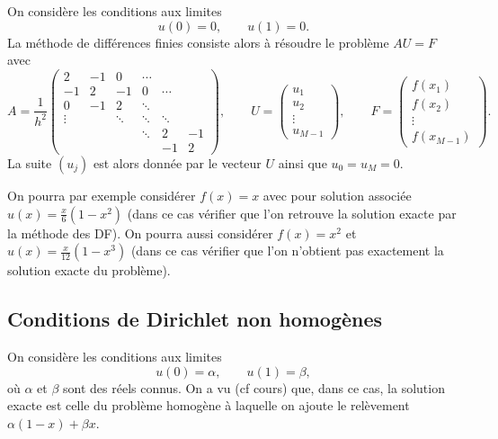 \documentclass[12pt]{article}
\begin{document}
On consid\`ere les conditions aux limites
\begin{equation}
  \label{eq:Dir_hom}
  u(0) = 0 , \qquad u(1) = 0 .
\end{equation}
La m\'ethode de diff\'erences finies consiste alors \`a r\'esoudre le probl\`eme
$A U = F$ avec
\begin{equation}
  \label{eq:matDir}
  A = \dfrac{1}{h^2} 
  \begin{pmatrix} 
    2 & -1 & 0 & \cdots
    \\
    -1 & 2 & -1 & 0 & \cdots
    \\
    0 & -1 & 2 & \ddots &
    \\
    \vdots & & \ddots & \ddots & \ddots
    \\
    & & &  \ddots & 2 & -1
    \\
    & &  & & -1 & 2
  \end{pmatrix} , \qquad U = 
  \begin{pmatrix}
    u_1 \\ u_2 \\ \vdots \\ u_{M-1}
  \end{pmatrix} , \qquad F = 
  \begin{pmatrix}
    f(x_1) \\ f(x_2) \\ \vdots \\ f(x_{M-1})
  \end{pmatrix} .
\end{equation}
La suite $(u_j)$ est alors donn\'ee par le vecteur $U$ ainsi que $u_0 = u_M = 0$.


On pourra par exemple consid\'erer $f(x)=x$ avec pour solution associ\'ee
$u(x) = \frac{x}{6}(1-x^2)$ (dans ce cas v\'erifier que l'on retrouve la solution exacte
par la m\'ethode des DF).
On pourra aussi consid\'erer $f(x) = x^2$ et $u(x) = \frac{x}{12}(1-x^3)$
(dans ce cas v\'erifier que l'on n'obtient pas exactement la solution exacte du probl\`eme).

\subsection{Conditions de Dirichlet non homog\`enes}
On consid\`ere les conditions aux limites
\begin{equation}
  \label{eq:Dir_non_hom}
  u(0) = \alpha , \qquad u(1) = \beta ,
\end{equation}
o\`u $\alpha$ et $\beta$ sont des r\'eels connus.
On a vu (cf cours) que, dans ce cas, la solution exacte est celle du probl\`eme homog\`ene
\`a laquelle on ajoute le rel\`evement $\alpha (1-x) + \beta x$.
\end{document}
